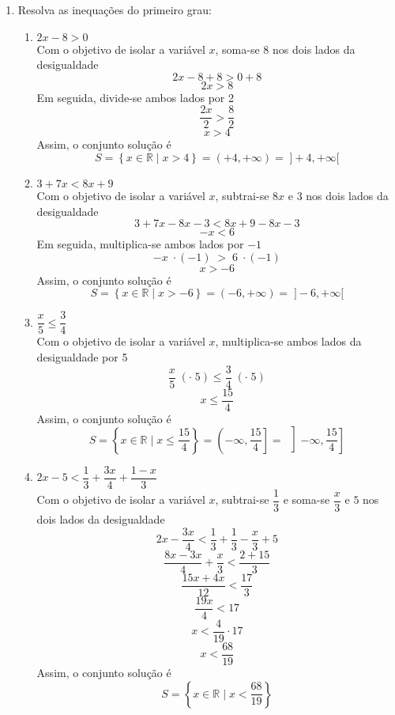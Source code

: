 	\begin{enumerate}
	   \item Resolva as inequações do primeiro grau:
            \begin{enumerate} 
			\item $2x - 8 > 0$\\
			Com o objetivo de isolar a variável $x$, soma-se $8$ nos dois lados da desigualdade
			\[ 
            2x - 8 +8 > 0 +8 
            \]
			\[ 
            2x > 8
            \]
			Em seguida, divide-se ambos lados por 2
			\[ 
            \dfrac{2x}{2}  > \dfrac{8}{2}  
            \]
			\[ 
            x > 4 
            \]
			Assim, o conjunto solução é
			\[
			S=\left\{ x \in \mathbb{R} \mid x >4 \right\} = (+4, +\infty) = \;]+4, +\infty[ 
			\]
			\item $3 + 7x < 8x + 9$\\
			Com o objetivo de isolar a variável $x$, subtrai-se $8x$ e $3$ nos dois lados da desigualdade
			\[ 
            3 + 7x-8x -3 < 8x + 9 -8x -3 
            \]
			\[ 
            -x < 6
            \]
			Em seguida, multiplica-se ambos lados por $-1$
			\[ 
            -x \;  \cdot (-1) \;  > \; 6 \;  \cdot (-1)
            \]
			\[ 
            x > -6
            \]
			Assim, o conjunto solução é
			\[
			S=\left\{ x \in \mathbb{R} \mid x > -6 \right\} = (-6, +\infty) = \; ]-6, +\infty[ 
			\]
			\item $\dfrac{x}{5} \le \dfrac{3}{4}$\\
			
			Com o objetivo de isolar a variável $x$, multiplica-se ambos lados da desigualdade por 5
			\[ 
            \dfrac{x}{5} \;  (\cdot \; 5) \le \dfrac{3}{4} \;  (\cdot \; 5)
            \]
			\[ 
            x \le \dfrac{15}{4}
            \]
			Assim, o conjunto solução é
			\[
			S=\left\{ x \in \mathbb{R} \mid x \le \dfrac{15}{4} \right\} = \left(-\infty,\dfrac{15}{4}\right] = \; \left]-\infty, \dfrac{15}{4}\right]
			\]
			\item $2x - 5 < \dfrac{1}{3}+\dfrac{3x}{4}+\dfrac{1-x}{3}$\\
			Com o objetivo de isolar a variável $x$, subtrai-se $\dfrac{1}{3}$ e soma-se $\dfrac{x}{3}$ e $5$ nos dois lados da desigualdade
			\[
			2x - \dfrac{3x}{4} < \dfrac{1}{3} + \dfrac{1}{3} - \dfrac{x}{3} + 5
			\]
			\[ 
            \dfrac{8x - 3x}{4} + \dfrac{x}{3} < \dfrac{2 + 15}{3}
            \]
			\[ 
            \dfrac{15x+4x}{12} < \dfrac{17}{3} 
            \]
			\[ 
            \dfrac{19x}{4}  < 17 
            \]
			\[ 
            x < \dfrac{4}{19} \cdot 17
            \]
			\[
			x < \dfrac{68}{19}
			\]
			Assim, o conjunto solução é
			\[
			S=\left\{ x \in \mathbb{R} \mid x < \dfrac{68}{19} \right\}
			\]
            

\end{enumerate}
\end{enumerate}
